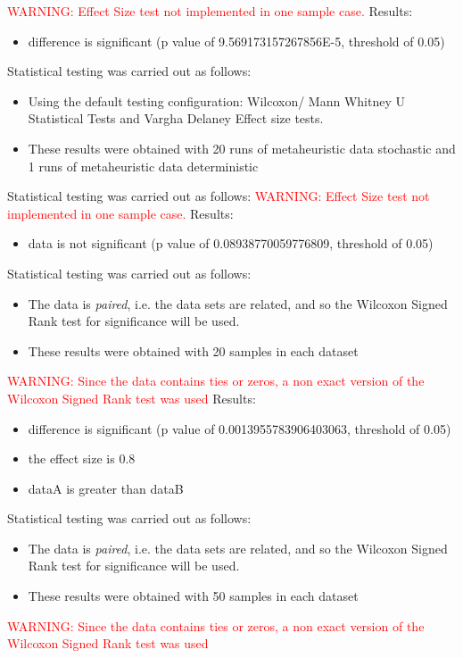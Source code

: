 \documentclass[]{article}
\begin{document}
\textcolor{Red}{WARNING: Effect Size test not implemented in one sample case.
}
Results:
\begin{itemize}
\item{difference is significant (p value of 9.569173157267856E-5, threshold of 0.05)}
\end{itemize}Statistical testing was carried out as follows: \begin{itemize}
\item{Using the default testing configuration: Wilcoxon/ Mann Whitney U Statistical Tests and Vargha Delaney Effect size tests.}
\item{These results were obtained with 20 runs of metaheuristic data stochastic and 1 runs of metaheuristic data deterministic}
\end{itemize}Statistical testing was carried out as follows: 
\textcolor{Red}{WARNING: Effect Size test not implemented in one sample case.
}
Results:
\begin{itemize}
\item{data is not significant (p value of 0.08938770059776809, threshold of 0.05)}
\end{itemize}Statistical testing was carried out as follows: \begin{itemize}
\item{The data is \textit{paired}, i.e. the data sets are related, and so the Wilcoxon Signed Rank test for significance will be used.}
\item{These results were obtained with 20 samples in each dataset}
\end{itemize}
\textcolor{Red}{WARNING: Since the data contains ties or zeros, a non exact version of the Wilcoxon Signed Rank test was used
}
Results:
\begin{itemize}
\item{difference is significant (p value of 0.0013955783906403063, threshold of 0.05)}
\item{the effect size is 0.8}
\item{dataA is greater than dataB}
\end{itemize}Statistical testing was carried out as follows: \begin{itemize}
\item{The data is \textit{paired}, i.e. the data sets are related, and so the Wilcoxon Signed Rank test for significance will be used.}
\item{These results were obtained with 50 samples in each dataset}
\end{itemize}
\textcolor{Red}{WARNING: Since the data contains ties or zeros, a non exact version of the Wilcoxon Signed Rank test was used
}
\end{document}
